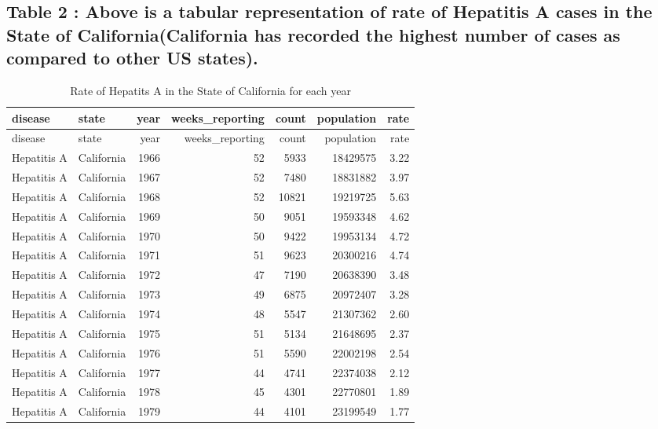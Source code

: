 \documentclass[
]{article}
\begin{document}
\hypertarget{table-2-above-is-a-tabular-representation-of-rate-of-hepatitis-a-cases-in-the-state-of-californiacalifornia-has-recorded-the-highest-number-of-cases-as-compared-to-other-us-states.}{%
\subsection{Table 2 : Above is a tabular representation of rate of
Hepatitis A cases in the State of California(California has recorded the
highest number of cases as compared to other US
states).}\label{table-2-above-is-a-tabular-representation-of-rate-of-hepatitis-a-cases-in-the-state-of-californiacalifornia-has-recorded-the-highest-number-of-cases-as-compared-to-other-us-states.}}

\begin{longtable}[]{@{}llrrrrr@{}}
\caption{Rate of Hepatits A in the State of California for each
year}\tabularnewline
\toprule
disease & state & year & weeks\_reporting & count & population & rate \\
\midrule
\endfirsthead
\toprule
disease & state & year & weeks\_reporting & count & population & rate \\
\midrule
\endhead
Hepatitis A & California & 1966 & 52 & 5933 & 18429575 & 3.22 \\
Hepatitis A & California & 1967 & 52 & 7480 & 18831882 & 3.97 \\
Hepatitis A & California & 1968 & 52 & 10821 & 19219725 & 5.63 \\
Hepatitis A & California & 1969 & 50 & 9051 & 19593348 & 4.62 \\
Hepatitis A & California & 1970 & 50 & 9422 & 19953134 & 4.72 \\
Hepatitis A & California & 1971 & 51 & 9623 & 20300216 & 4.74 \\
Hepatitis A & California & 1972 & 47 & 7190 & 20638390 & 3.48 \\
Hepatitis A & California & 1973 & 49 & 6875 & 20972407 & 3.28 \\
Hepatitis A & California & 1974 & 48 & 5547 & 21307362 & 2.60 \\
Hepatitis A & California & 1975 & 51 & 5134 & 21648695 & 2.37 \\
Hepatitis A & California & 1976 & 51 & 5590 & 22002198 & 2.54 \\
Hepatitis A & California & 1977 & 44 & 4741 & 22374038 & 2.12 \\
Hepatitis A & California & 1978 & 45 & 4301 & 22770801 & 1.89 \\
Hepatitis A & California & 1979 & 44 & 4101 & 23199549 & 1.77 \\

\end{longtable}
\end{document}

